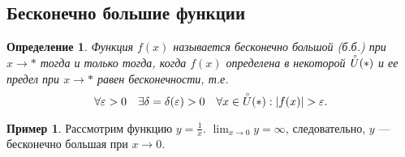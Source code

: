 \documentclass[a4paper,12pt]{article} %
\newtheorem{definition}{Определение}[section]
\theoremstyle{remark}
\theoremstyle{definition}
\newtheorem{exmp}{Пример}[section]
\begin{document}
\subsection{Бесконечно большие функции}
\begin{definition}
	Функция $f(x)$ называется бесконечно большой (б.б.) при $x\to *$ тогда и только тогда, когда $f(x)$ определена в некоторой $\accentset{\circ}{U}(*)$ и ее предел при $x\to *$ равен бесконечности, т.е.
	\[
	\forall \varepsilon>0 \quad \exists \delta=\delta(\varepsilon)>0 \quad \forall x\in \accentset{\circ}{U}(*) : |f(x)| > \varepsilon
	.\] 
\end{definition}
\begin{exmp}
	Рассмотрим функцию $y=\frac{1}{x}$. $\lim_{x \to 0} y = \infty$, следовательно, $y$ --- бесконечно большая при $x\to 0$.
\end{exmp}
\end{document}
